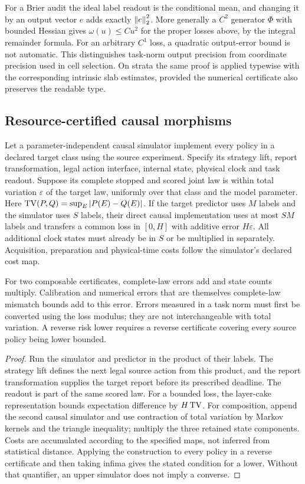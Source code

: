 For a Brier audit the ideal label readout is the conditional mean, and changing it by an output vector $e$ adds exactly $\left\lVert e\right\rVert_2^2$. More generally a $C^2$ generator $\Phi$ with bounded Hessian gives $\omega(u)\le Cu^2$ for the proper losses above, by the integral remainder formula. For an arbitrary $C^1$ loss, a quadratic output-error bound is not automatic. This distinguishes task-norm output precision from coordinate precision used in cell selection. On strata the same proof is applied typewise with the corresponding intrinsic slab estimates, provided the numerical certificate also preserves the readable type.

\subsection{Resource-certified causal morphisms}
\begin{proposition}\label{prop:morphism}
Let a parameter-independent causal simulator implement every policy in a declared target class using the source experiment. Specify its strategy lift, report transformation, legal action interface, internal state, physical clock and task readout. Suppose its complete stopped and scored joint law is within total variation $\varepsilon$ of the target law, uniformly over that class and the model parameter. Here $\operatorname{TV}(P,Q)=\sup_E|P(E)-Q(E)|$. If the target predictor uses $M$ labels and the simulator uses $S$ labels, their direct causal implementation uses at most $SM$ labels and transfers a common loss in $[0,H]$ with additive error $H\varepsilon$. All additional clock states must already be in $S$ or be multiplied in separately. Acquisition, preparation and physical-time costs follow the simulator's declared cost map.

For two composable certificates, complete-law errors add and state counts multiply. Calibration and numerical errors that are themselves complete-law mismatch bounds add to this error. Errors measured in a task norm must first be converted using the loss modulus; they are not interchangeable with total variation. A reverse risk lower requires a reverse certificate covering every source policy being lower bounded.
\end{proposition}
\begin{proof}
Run the simulator and predictor in the product of their labels. The strategy lift defines the next legal source action from this product, and the report transformation supplies the target report before its prescribed deadline. The readout is part of the same scored law. For a bounded loss, the layer-cake representation bounds expectation difference by $H\operatorname{TV}$. For composition, append the second causal simulator and use contraction of total variation by Markov kernels and the triangle inequality; multiply the three retained state components. Costs are accumulated according to the specified maps, not inferred from statistical distance. Applying the construction to every policy in a reverse certificate and then taking infima gives the stated condition for a lower. Without that quantifier, an upper simulator does not imply a converse.
\end{proof}
